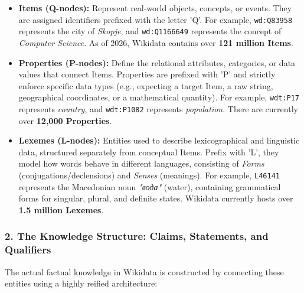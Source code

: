 \begin{itemize}
    \item \textbf{Items (Q-nodes):} Represent real-world objects, concepts, or events. They are assigned identifiers prefixed with the letter 'Q'. For example, \texttt{wd:Q83958} represents the city of \textit{Skopje}, and \texttt{wd:Q1166649} represents the concept of \textit{Computer Science}. As of 2026, Wikidata contains over \textbf{121 million Items}.
    
    \item \textbf{Properties (P-nodes):} Define the relational attributes, categories, or data values that connect Items. Properties are prefixed with 'P' and strictly enforce specific data types (e.g., expecting a target Item, a raw string, geographical coordinates, or a mathematical quantity). For example, \texttt{wdt:P17} represents \textit{country}, and \texttt{wdt:P1082} represents \textit{population}. There are currently over \textbf{12,000 Properties}.
    
    \item \textbf{Lexemes (L-nodes):} Entities used to describe lexicographical and linguistic data, structured separately from conceptual Items. Prefix with 'L', they model how words behave in different languages, consisting of \textit{Forms} (conjugations/declensions) and \textit{Senses} (meanings). For example, \texttt{L46141} represents the Macedonian noun \textit{"вода"} (water), containing grammatical forms for singular, plural, and definite states. Wikidata currently hosts over \textbf{1.5 million Lexemes}.
\end{itemize}

\subsubsection*{2. The Knowledge Structure: Claims, Statements, and Qualifiers}
The actual factual knowledge in Wikidata is constructed by connecting these entities using a highly reified architecture:

